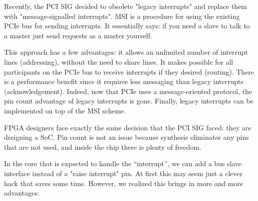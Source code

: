 \documentclass[a4paper, 12pt]{article}
\begin{document}
Recently,  the PCI SIG decided to obsolete "legacy interrupts" and
replace them with "message-signalled interrupts". MSI is a procedure for
using the existing PCIe bus for sending interrupts. It essentially says:
if you need a slave to talk to a master just send requests as a
master yourself.

This approach has a few advantages: it allows an unlimited
number of interrupt lines (addressing), without the need to share lines. It
makes possible for all participants on the PCIe bus to receive
interrupts if they desired (routing). There is a performance
benefit since it requires less messaging than legacy interrupts
(acknowledgement). Indeed, now that PCIe uses a message-oriented
protocol, the pin count advantage of legacy interrupts is gone.
Finally, legacy interrupts can be implemented on top of the
MSI scheme.

FPGA designers face exactly the same decision that the PCI SIG faced:
they are designing a SoC. Pin count is not an issue because synthesis
eliminates any pins that are not used, and inside the chip there is plenty of
freedom.

In the core that is expected to handle the ``interrupt'',
we can add a bus slave interface instead of a "raise
interrupt" pin.  At first this may seem just a clever hack that
saves some time. However, we realized this brings in more and more
advantages:
\end{document}
